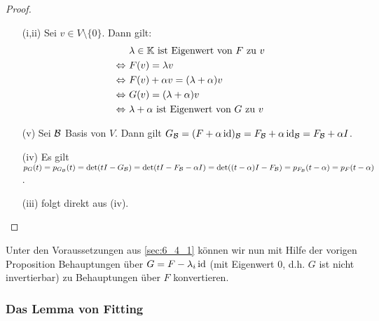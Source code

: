 \begin{proof}\
	\begin{itemize}
		\item[(i,ii)]
		Sei $ v \in V \setminus \{ 0 \} $. Dann gilt:
		\begin{align*}
			&\ \text{$ \lambda \in \mathbb K $ ist Eigenwert von $ F $ zu $ v $} \\
			\Leftrightarrow&\ F(v) = \lambda v \\
			\Leftrightarrow&\ F(v) + \alpha v = (\lambda + \alpha)v \\
			\Leftrightarrow&\ G(v) = (\lambda + \alpha)v \\
			\Leftrightarrow&\ \text{$ \lambda + \alpha $ ist Eigenwert von $ G $ zu $ v $}
		\end{align*}
		\item[(v)]
		Sei $ \mathcal{B} $ Basis von $ V $. Dann gilt $ G_{\mathcal{B}} = (F + \alpha \operatorname{id})_{\mathcal{B}} = F_{\mathcal{B}} + \alpha \operatorname{id}_{\mathcal{B}} = F_{\mathcal{B}} + \alpha I $.
		\item[(iv)]
		Es gilt $ p_G(t) = p_{G_{\mathcal{B}}}(t) = \det(tI - G_{\mathcal{B}}) = \det(tI - F_{\mathcal{B}} - \alpha I) = \det((t-\alpha)I - F_{\mathcal{B}}) = p_{F_{\mathcal{B}}}(t-\alpha) = p_F(t-\alpha) $.
		\item[(iii)]
		folgt direkt aus (iv). \qedhere
	\end{itemize}
\end{proof}

\noindent Unter den Voraussetzungen aus \ref{sec:6_4_1} können wir nun mit Hilfe der vorigen Proposition Behauptungen über $ G = F - \lambda_i \operatorname{id} $ (mit Eigenwert 0, d.h. $ G $ ist nicht invertierbar) zu Behauptungen über $ F $ konvertieren.

\subsubsection{Das Lemma von Fitting}
\label{sec:6_4_4}


